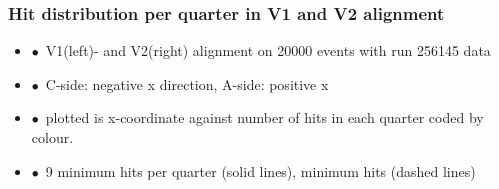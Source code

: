 \documentclass[aspectratio=1610, 12pt]{beamer}
\begin{document}
\begin{frame}\frametitle{Hit distribution per quarter in V1 and V2 alignment}
  \begin{itemize}
    \item $\bullet$\, V1(left)- and V2(right) alignment on 20000 events with run 256145 data
    \item $\bullet$\, C-side: negative x direction, A-side: positive x
    \item $\bullet$\, plotted is x-coordinate against number of hits in each quarter coded by colour.
    \item $\bullet$\, 9 minimum hits per quarter (solid lines), minimum hits (dashed lines)
  \end{itemize}
  \begin{figure}
  \end{figure}
\end{frame}
\end{document}
